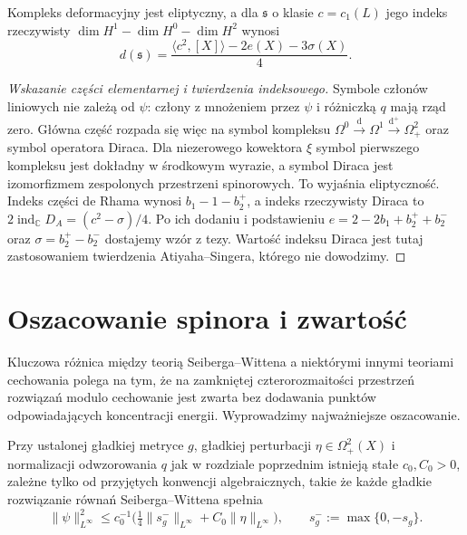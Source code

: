\begin{twierdzenie}
\label{thm:tg-sw-elliptic}
Kompleks deformacyjny jest eliptyczny, a dla $\mathfrak s$
o klasie $c=c_1(L)$ jego indeks rzeczywisty
$\dim H^1-\dim H^0-\dim H^2$ wynosi
\[
d(\mathfrak s)=\frac{\langle c^2,[X]\rangle-2e(X)-3\sigma(X)}4.
\]
\end{twierdzenie}

\begin{proof}[Wskazanie części elementarnej i twierdzenia indeksowego]
Symbole członów liniowych nie zależą od $\psi$:
człony z mnożeniem przez $\psi$ i różniczką $q$ mają rząd zero.
Główna część rozpada się więc na symbol kompleksu
$\Omega^0\xrightarrow{\mathrm d}\Omega^1
\xrightarrow{\mathrm d^+}\Omega^2_+$ oraz symbol operatora Diraca.
Dla niezerowego kowektora $\xi$ symbol pierwszego
kompleksu jest dokładny w środkowym wyrazie, a symbol
Diraca jest izomorfizmem zespolonych przestrzeni spinorowych.
To wyjaśnia eliptyczność.
Indeks części de Rhama wynosi $b_1-1-b_2^+$,
a indeks rzeczywisty Diraca to
$2\operatorname{ind}_{\mathbb C}D_A=(c^2-\sigma)/4$.
Po ich dodaniu i podstawieniu
$e=2-2b_1+b_2^++b_2^-$ oraz
$\sigma=b_2^+-b_2^-$ dostajemy wzór z tezy.
Wartość indeksu Diraca jest tutaj zastosowaniem
twierdzenia Atiyaha--Singera, którego nie dowodzimy.
\end{proof}

\section{Oszacowanie spinora i zwartość}
\label{sec:tg-sw-compact}

Kluczowa różnica między teorią Seiberga--Wittena a niektórymi
innymi teoriami cechowania polega na tym, że na zamkniętej
czterorozmaitości przestrzeń rozwiązań modulo cechowanie
jest zwarta bez dodawania punktów odpowiadających
koncentracji energii. Wyprowadzimy najważniejsze oszacowanie.

\begin{lemat}
\label{lem:tg-sw-bound}
Przy ustalonej gładkiej metryce $g$, gładkiej perturbacji
$\eta\in\Omega^2_+(X)$ i normalizacji odwzorowania $q$
jak w rozdziale poprzednim istnieją stałe $c_0,C_0>0$,
zależne tylko od przyjętych konwencji algebraicznych, takie że
każde gładkie rozwiązanie równań Seiberga--Wittena spełnia
\[
\|\psi\|_{L^\infty}^2\le
c_0^{-1}\bigl(\tfrac14\|s_g^-\|_{L^\infty}
+C_0\|\eta\|_{L^\infty}\bigr),
\qquad s_g^-:=\max\{0,-s_g\}.
\]
\end{lemat}

